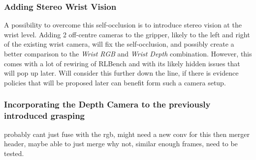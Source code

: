 \subsubsection{Adding Stereo Wrist Vision}
A possibility to overcome this self-occlusion is to introduce stereo vision at the wrist level. Adding 2 off-centre cameras to the gripper, likely to the left and right of the existing wrist camera, will fix the self-occlusion, and possibly create a better comparison to the \emph{Wrist RGB} and \emph{Wrist Depth} combination. However, this comes with a lot of rewiring of RLBench and with its likely hidden issues that will pop up later. Will consider this further down the line, if there is evidence policies that will be proposed later can benefit form such a camera setup.



\subsubsection{Incorporating the Depth Camera to the previously introduced grasping}
probably cant just fuse with the rgb, might need a new conv for this then merger header, maybe able to just merge why not, similar enough frames, need to be tested.


